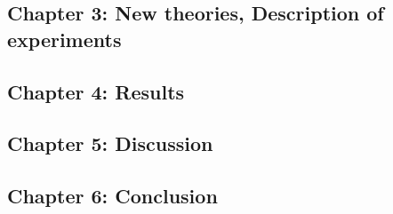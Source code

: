 \documentclass{article}
\begin{document}
	\subsection{Chapter 3: New theories, Description of experiments}
	\subsection{Chapter 4: Results}
	\subsection{Chapter 5: Discussion}
	\subsection{Chapter 6: Conclusion}
	
	
	
	
\end{document}
